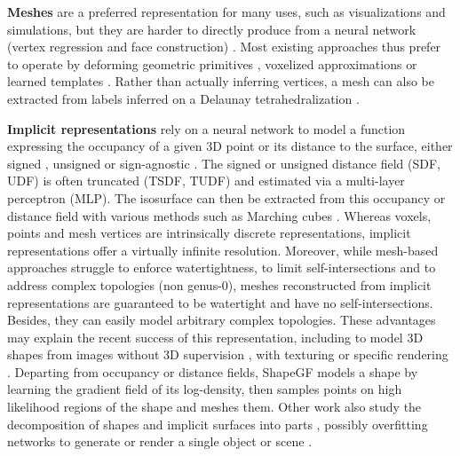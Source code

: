 \documentclass[10pt,twocolumn,letterpaper]{article}
\begin{document}
\textbf{Meshes} are a preferred representation for many uses, such as visualizations and simulations, but they are harder to directly produce from a neural network (vertex regression and face construction) \cite{Nash2020polygen}. Most existing approaches thus prefer to operate by deforming geometric primitives \cite{Groueix2018CVPR, Wang2018ECCV, Lin2019CVPR, Wen2019ICCV}, voxelized approximations \cite{Liao2018CVPR, Gkioxari2019ICCV} or learned templates \cite{Groueix2018ECCV, Kanazawa2018ECCV}. Rather than actually inferring vertices, a mesh can also be extracted from labels inferred on a Delaunay tetrahedralization \cite{Luo2021AAAI}.

\textbf{Implicit representations} rely on a neural network to model a function expressing the occupancy of a given 3D point \cite{Chen2019CVPR, Mescheder2019CVPR} or its distance to the surface, either signed \cite{Michalkiewicz2019ICCV, Park2019CVPR, Gropp2020ICML}, unsigned \cite{Chibane2020Neural} or sign-agnostic \cite{Atzmon2020CVPR,boulch2021needrop}. The signed or unsigned distance field (SDF, UDF) is often truncated (TSDF, TUDF) and estimated via a multi-layer perceptron (MLP). The isosurface can then be extracted from this occupancy or distance field with various methods such as Marching cubes \cite{Lorensen1987CG}. Whereas voxels, points and mesh vertices are intrinsically discrete representations, implicit representations offer a virtually infinite resolution. Moreover, while mesh-based approaches struggle to enforce watertightness, to limit self-intersections and to address complex topologies (non genus-0), meshes reconstructed from implicit representations are guaranteed to be watertight and have no self-intersections. Besides, they can easily model arbitrary complex topologies. These advantages may explain the recent success of this representation, including to model 3D shapes from images without 3D supervision \cite{Liu2019NIPS, Sitzmann2019NIPS, Niemeyer2020CVPR}, with texturing \cite{Oechsle2019ICCV} or specific rendering \cite{Liu2020CVPR}.
Departing from occupancy or distance fields, ShapeGF \cite{Cai2020ShapeGF} models a shape by learning the gradient field of its log-density, then samples points on high likelihood regions of the shape and meshes them.
Other work also study the decomposition of shapes and implicit surfaces into parts \cite{Genova2019ICCV, Genova2020CVPR, Paschalidou2020CVPR, Deng2020CvxNet, Jeruzalski2020ECCV, Tretschk2020ECCV}, possibly overfitting networks to generate or render a single object or scene \cite{Williams2019DeepGeometric, Sitzmann2019siren, liu2020neural, Zhao2021SignAgnostic, Takikawa2021NGLOD, Martel2021ACORN, Yan2021Continual}.
\end{document}
